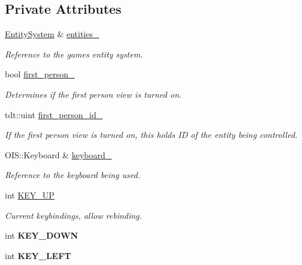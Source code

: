 \subsection*{Private Attributes}
\begin{DoxyCompactItemize}
\item 
\hyperlink{class_entity_system}{Entity\+System} \& \hyperlink{class_input_system_ad7cd4d1cc1598f0d72c8531ba190ed94}{entities\+\_\+}
\begin{DoxyCompactList}\small\item\em Reference to the game\textquotesingle{}s entity system. \end{DoxyCompactList}\item 
bool \hyperlink{class_input_system_a3c7bdb083dc27e80b9d20f6f8fcedb79}{first\+\_\+person\+\_\+}
\begin{DoxyCompactList}\small\item\em Determines if the first person view is turned on. \end{DoxyCompactList}\item 
tdt\+::uint \hyperlink{class_input_system_ab6760a6b3b09cc28e564eac23ea4fd53}{first\+\_\+person\+\_\+id\+\_\+}
\begin{DoxyCompactList}\small\item\em If the first person view is turned on, this holds ID of the entity being controlled. \end{DoxyCompactList}\item 
O\+I\+S\+::\+Keyboard \& \hyperlink{class_input_system_a7b1e5fc521e98e9a4b0684fb1a9711c9}{keyboard\+\_\+}
\begin{DoxyCompactList}\small\item\em Reference to the keyboard being used. \end{DoxyCompactList}\item 
int \hyperlink{class_input_system_a28f6fccea67986967559e39cf0215c8b}{K\+E\+Y\+\_\+\+UP}
\begin{DoxyCompactList}\small\item\em Current keybindings, allow rebinding. \end{DoxyCompactList}\item 
int {\bfseries K\+E\+Y\+\_\+\+D\+O\+WN}\hypertarget{class_input_system_a450bfb7fffc6ccb8cb846b5d4380f906}{}\label{class_input_system_a450bfb7fffc6ccb8cb846b5d4380f906}

\item 
int {\bfseries K\+E\+Y\+\_\+\+L\+E\+FT}\hypertarget{class_input_system_aa78b74b66edcafd58f65205eff0f320f}{}\label{class_input_system_aa78b74b66edcafd58f65205eff0f320f}


\end{DoxyCompactItemize}
